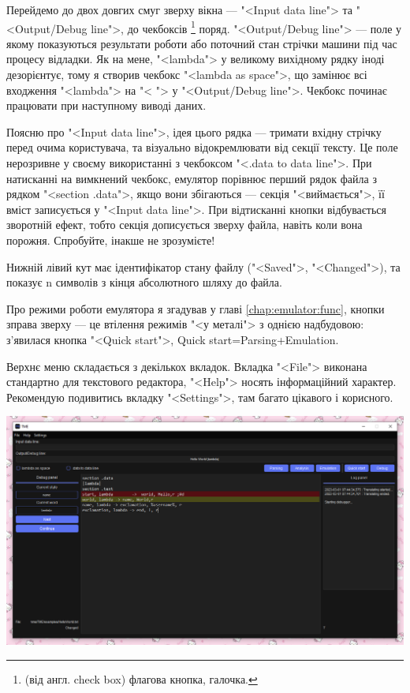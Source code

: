 \documentclass[oneside,final,14pt]{extreport}
\newenvironment{changemargin}[2]{%
\begin{list}{}{%
\setlength{\topsep}{0pt}%
\setlength{\leftmargin}{#1}%
\setlength{\rightmargin}{#2}%
\setlength{\listparindent}{\parindent}%
\setlength{\itemindent}{\parindent}%
\setlength{\parsep}{\parskip}%
}%
\item[]}{\end{list}}
\begin{document}
Перейдемо до двох довгих смуг зверху вікна ---  "<Input data line"> та "<Output/Debug line">, до чекбоксів
\footnote{(від англ. check box) флагова кнопка, галочка.}
поряд. "<Output/Debug line"> --- поле у якому показуються результати роботи або поточний стан стрічки машини під час процесу відладки. Як на мене, "<lambda"> у великому вихідному рядку іноді дезорієнтує, тому я створив  чекбокс "<lambda as space">, що замінює всі входження "<lambda"> на "< "> у "<Output/Debug line">. Чекбокс починає працювати при наступному виводі даних.

Поясню про "<Input data line">, ідея цього рядка --- тримати вхідну стрічку перед очима користувача, та візуально відокремлювати від секції тексту. Це поле нерозривне у своєму використанні з чекбоксом "<.data to data line">. При натисканні на вимкнений чекбокс, емулятор порівнює перший рядок файла з рядком "<section .data">, якщо вони збігаються --- секція "<виймається">, її вміст записується у "<Input data line">. При відтисканні кнопки відбувається зворотній ефект, тобто секція дописується зверху файла, навіть коли вона порожня. Спробуйте, інакше не зрозумієте!

Нижній лівий кут має ідентифікатор стану файлу ("<Saved">, "<Changed">), та показує n символів з кінця абсолютного шляху до файла.

Про режими роботи емулятора я згадував у главі
\ref{chap:emulator:func}, кнопки зправа зверху --- це втілення режимів "<у металі"> з однією надбудовою: з'явилася кнопка "<Quick start">, Quick start=Parsing+Emulation.

Верхнє меню складається з декількох вкладок. Вкладка "<File"> виконана стандартно для текстового редактора, "<Help"> носять інформаційний характер. Рекомендую подивитись вкладку "<Settings">, там багато цікавого і корисного.

\begin{changemargin}{-10,3cm}{1,1cm}
\begin{landscape}
\label{screenshot}
\includegraphics[scale=0.77]{1}
\end{landscape}
\end{changemargin}
\end{document}
